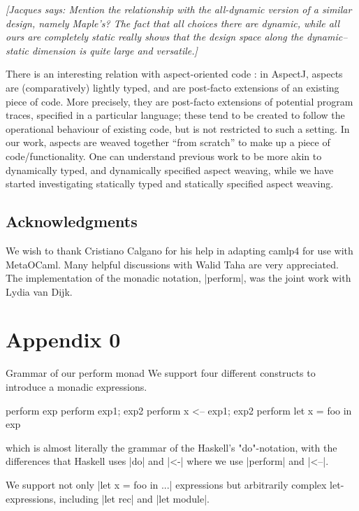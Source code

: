 \documentclass[draft]{elsart}
\newcommand{\jacques}[1]{{\it [Jacques says: #1]}}
\begin{document}
\jacques{Mention the relationship with the all-dynamic version of a 
similar design, namely Maple's?  The fact that all choices there are
dynamic, while all ours are completely static really shows that the
design space along the dynamic--static dimension is quite large and
versatile.}

There is an interesting relation with aspect-oriented code
\cite{kiczales97aspectoriented}: in AspectJ, 
aspects are (comparatively) lightly typed, and are post-facto extensions of an
existing piece of code.  More precisely, they are post-facto extensions of
potential program traces, specified in a particular language; these tend
to be created to follow the operational behaviour of existing code, but
is not restricted to such a setting.
In our work, aspects are weaved together ``from scratch'' to
make up a piece of code/functionality.  One can understand previous work to be
more akin to dynamically typed, and dynamically specified aspect weaving, while
we have started investigating statically typed and statically specified
aspect weaving.

\subsection*{Acknowledgments}
We wish to thank Cristiano Calgano for his help in adapting camlp4 for
use with MetaOCaml. Many helpful discussions with Walid Taha are very
appreciated. The implementation of the monadic notation, |perform|,
was the joint work with Lydia van Dijk.



\section{Appendix 0}
\label{app:perform}
Grammar of our perform monad
We support four different constructs to introduce a monadic
expressions.

\begin{code}
  perform exp
  perform exp1; exp2
  perform x <-- exp1; exp2
  perform let x = foo in exp
\end{code}

which is almost literally the grammar of the Haskell's "do"-notation,
with the differences that Haskell uses |do| and |<-| where we use
|perform| and |<--|.

We support not only |let x = foo in ...|  expressions but arbitrarily
complex let-expressions, including |let rec| and |let module|.
\end{document}
